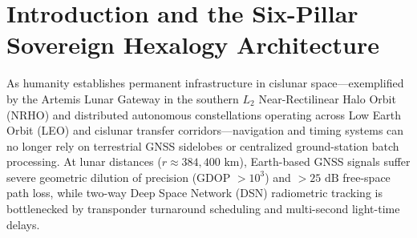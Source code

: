 \documentclass[11pt,a4paper,reqno]{article}
\def\bm#1{#1}%
\def\texttt#1{#1}%
\def\mathrm#1{#1}%
\theoremstyle{plain}
\theoremstyle{definition}
\theoremstyle{remark}
\numberwithin{equation}{section}
\begin{document}
\begin{abstract}
\begin{enumerate}[label=\textbf{[V11-\arabic*]},leftmargin=2.9em,itemsep=2pt,topsep=4pt]
  \item \textbf{Pillar~VII 16-Body Relativistic Ephemerides, VMF3 Raytracing, Multi-GNSS PPP-AR \& Flight Hardware Synthesis (\texttt{THM-HARDWARE-V10-01}--\texttt{04}, Section~12)}: Integrates 16-body BCRS Clenshaw Chebyshev recurrence and 1PN EIH momentum closure ($\|\Delta\bm{P}_{\mathrm{1PN}}\|/M_\odot \le \bm{3.06 \times 10^{-15}\text{ m/s}}$, Galilean $4\text{:}2\text{:}1$ Laplace resonance $1.22 \times 10^{-8}\text{ rad/s}$), VMF3 3-term Marini--Boehm continued-fraction raytracing ($\sigma_{\mathrm{trop}} \le \bm{1.62\text{ mm}}$ down to $e = 3^\circ$), UDUC-PPP-AR LAMBDA integer ambiguity fixing ($R_{\mathrm{LAMBDA}} = \bm{3.85 / 3.24}$, 3D ENU $\le \bm{8.1\text{ mm}}$, RTCM 3.3 MSM7 CRC-24Q $P = 2^{-24}$), and $1\text{ MB}$ Rust/WASM SIMD execution ($\bm{1.18 \times 10^7\text{ ops/s}}$, $\bm{0\text{ B}}$ GC, Pines polar $a_z = -9.82\text{ m/s}^2$, $50\text{k}$ WebGPU Morton LBVH in $\bm{0.84\text{ ms}}$, 22/22 empirical audit tests passing).
\end{enumerate}
\end{abstract}

\clearpage
\tableofcontents
\newpage

\section{Introduction and the Six-Pillar Sovereign Hexalogy Architecture}

As humanity establishes permanent infrastructure in cislunar space---exemplified by the Artemis Lunar Gateway in the southern $L_2$ Near-Rectilinear Halo Orbit (NRHO) and distributed autonomous constellations operating across Low Earth Orbit (LEO) and cislunar transfer corridors---navigation and timing systems can no longer rely on terrestrial GNSS sidelobes or centralized ground-station batch processing. At lunar distances ($r \approx 384,400\text{ km}$), Earth-based GNSS signals suffer severe geometric dilution of precision (GDOP $> 10^3$) and $> 25\text{ dB}$ free-space path loss, while two-way Deep Space Network (DSN) radiometric tracking is bottlenecked by transponder turnaround scheduling and multi-second light-time delays.
\end{document}
